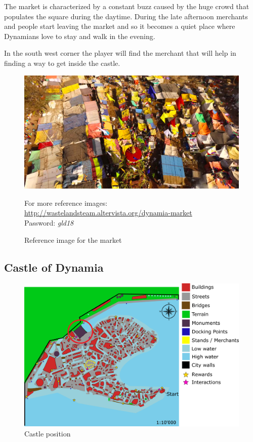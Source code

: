 The market is characterized by a constant buzz caused by the huge crowd that populates  the square during the daytime. During the late afternoon merchants and people start leaving the market and so it becomes a quiet place where Dynamians love to stay and walk in the evening.

In the south west corner the player will find the merchant that will help in finding a way to get inside the castle.
 
\begin{figure}[H]
  \centering
  \includegraphics[width=\textwidth]{Images/Landmarks/market}

  \caption{Reference image for the market}
    For more reference images: \href{http://wastelandsteam.altervista.org/dynamia-dead-end}{http://wastelandsteam.altervista.org/dynamia-market}\\Password: \textit{gld18}
\end{figure}

\subsection{Castle of Dynamia}
\begin{figure}[H]
  \centering
  \includegraphics[width=12cm]{Images/Maps/dynamia_castleOfDynamia}
  \caption{Castle position}
\end{figure}

